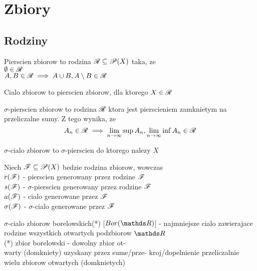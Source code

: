 \section{Zbiory}
\subsection{Rodziny}
\begin{multicols}{2}
    
    {\color{def}Pierscien zbiorow} to rodzina $\mathcal{R}\subseteq \mathcal{P}(X)$ taka, ze\smallskip\\
    \point $\emptyset\in \mathcal{R}$\smallskip\\
    \point $A, B\in\mathcal{R}\implies A\cup B,A\setminus B\in \mathcal{R}$\smallskip
    
    {\color{def}Cialo zbiorow} to pierscien zbiorow, dla ktorego $X\in\mathcal{R}$\smallskip

    {\color{def}$\sigma$-pierscien zbiorow} to rodzina $\mathcal{R}$ ktora jest pierscieniem zamknietym na przeliczalne sumy. Z tego wynika, ze
    $$A_n\in\mathcal{R}\implies \lim\limits_{n\to\infty}\sup A_n,\lim\limits_{n\to\infty}\inf A_n\in\mathcal{R}$$
    
    {\color{def}$\sigma$-cialo zbiorow} to $\sigma$-pierscien do ktorego nalezy $X$\medskip

    \medskip

    Niech $\mathcal{F}\subseteq \mathcal{P}(X)$ bedzie rodzina zbiorow, wowczas\smallskip\\
    {\color{acc}\point $r(\mathcal{F})$} - pierscien generowany przez rodzine $\mathcal{F}$\smallskip\\
    {\color{acc}\point $s(\mathcal{F})$} - $\sigma$-pierscien generowany przez rodzine $\mathcal{F}$\smallskip\\
    {\color{acc}\point $a(\mathcal{F})$} - cialo generowane przez $\mathcal{F}$\smallskip\\
    {\color{acc}\point $\sigma(\mathcal{F})$} - $\sigma$-cialo generowane przez $\mathcal{F}$\medskip

    {\color{def}$\sigma$-cialo zbiorow borelowskich(*)} [$Bor(\R)$] - najmniejsze cialo zawierajace rodzine wszystkich otwartych podzbiorow $\R$\smallskip\\
    \indent (*) {\color{acc}zbior borelowski} - dowolny zbior ot-\\
    \indent warty (domkniety) uzyskany przez sume/prze-
    \indent kroj/dopelnienie przeliczalnie wielu 
    \indent zbiorow otwartych (domknietych)

\end{multicols}

